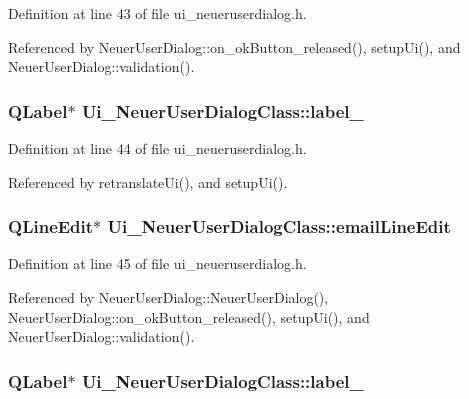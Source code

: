 Definition at line 43 of file ui\_\-neueruserdialog.h.

Referenced by NeuerUserDialog::on\_\-okButton\_\-released(), setupUi(), and NeuerUserDialog::validation().\hypertarget{class_ui___neuer_user_dialog_class_8ed918214691cdc84820230531e808ea}{
\subsubsection[label\_\-4]{\setlength{\rightskip}{0pt plus 5cm}QLabel$\ast$ {\bf Ui\_\-NeuerUserDialogClass::label\_}}}
\label{class_ui___neuer_user_dialog_class_8ed918214691cdc84820230531e808ea}




Definition at line 44 of file ui\_\-neueruserdialog.h.

Referenced by retranslateUi(), and setupUi().\hypertarget{class_ui___neuer_user_dialog_class_05a279f8550cee40c692ae767f1331db}{
\subsubsection[emailLineEdit]{\setlength{\rightskip}{0pt plus 5cm}QLineEdit$\ast$ {\bf Ui\_\-NeuerUserDialogClass::emailLineEdit}}}
\label{class_ui___neuer_user_dialog_class_05a279f8550cee40c692ae767f1331db}




Definition at line 45 of file ui\_\-neueruserdialog.h.

Referenced by NeuerUserDialog::NeuerUserDialog(), NeuerUserDialog::on\_\-okButton\_\-released(), setupUi(), and NeuerUserDialog::validation().\hypertarget{class_ui___neuer_user_dialog_class_5f9d776188c12dcffe8c31af6db843f4}{
\subsubsection[label\_\-5]{\setlength{\rightskip}{0pt plus 5cm}QLabel$\ast$ {\bf Ui\_\-NeuerUserDialogClass::label\_}}}
\label{class_ui___neuer_user_dialog_class_5f9d776188c12dcffe8c31af6db843f4}




